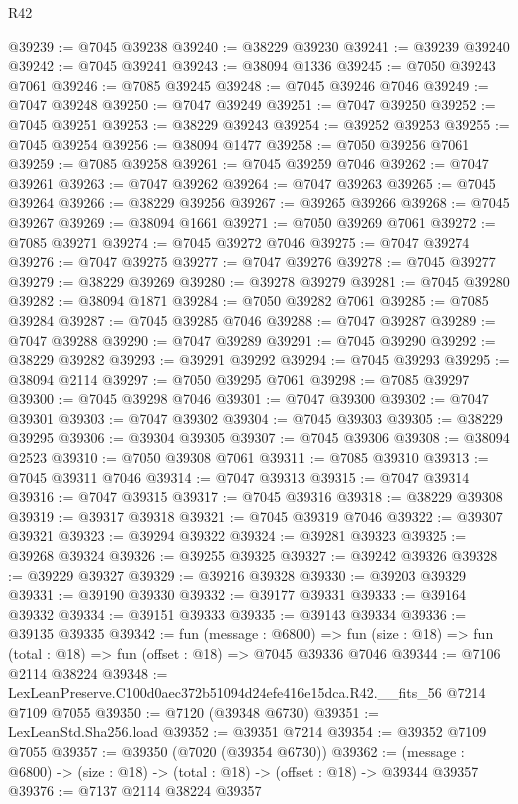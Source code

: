 \begin{lexlean}{R42}
\begin{coremodule}
{@39239 := @7045 @39238
@39240 := @38229 @39230
@39241 := @39239 @39240
@39242 := @7045 @39241
@39243 := @38094 @1336
@39245 := @7050 @39243 @7061
@39246 := @7085 @39245
@39248 := @7045 @39246 @7046
@39249 := @7047 @39248
@39250 := @7047 @39249
@39251 := @7047 @39250
@39252 := @7045 @39251
@39253 := @38229 @39243
@39254 := @39252 @39253
@39255 := @7045 @39254
@39256 := @38094 @1477
@39258 := @7050 @39256 @7061
@39259 := @7085 @39258
@39261 := @7045 @39259 @7046
@39262 := @7047 @39261
@39263 := @7047 @39262
@39264 := @7047 @39263
@39265 := @7045 @39264
@39266 := @38229 @39256
@39267 := @39265 @39266
@39268 := @7045 @39267
@39269 := @38094 @1661
@39271 := @7050 @39269 @7061
@39272 := @7085 @39271
@39274 := @7045 @39272 @7046
@39275 := @7047 @39274
@39276 := @7047 @39275
@39277 := @7047 @39276
@39278 := @7045 @39277
@39279 := @38229 @39269
@39280 := @39278 @39279
@39281 := @7045 @39280
@39282 := @38094 @1871
@39284 := @7050 @39282 @7061
@39285 := @7085 @39284
@39287 := @7045 @39285 @7046
@39288 := @7047 @39287
@39289 := @7047 @39288
@39290 := @7047 @39289
@39291 := @7045 @39290
@39292 := @38229 @39282
@39293 := @39291 @39292
@39294 := @7045 @39293
@39295 := @38094 @2114
@39297 := @7050 @39295 @7061
@39298 := @7085 @39297
@39300 := @7045 @39298 @7046
@39301 := @7047 @39300
@39302 := @7047 @39301
@39303 := @7047 @39302
@39304 := @7045 @39303
@39305 := @38229 @39295
@39306 := @39304 @39305
@39307 := @7045 @39306
@39308 := @38094 @2523
@39310 := @7050 @39308 @7061
@39311 := @7085 @39310
@39313 := @7045 @39311 @7046
@39314 := @7047 @39313
@39315 := @7047 @39314
@39316 := @7047 @39315
@39317 := @7045 @39316
@39318 := @38229 @39308
@39319 := @39317 @39318
@39321 := @7045 @39319 @7046
@39322 := @39307 @39321
@39323 := @39294 @39322
@39324 := @39281 @39323
@39325 := @39268 @39324
@39326 := @39255 @39325
@39327 := @39242 @39326
@39328 := @39229 @39327
@39329 := @39216 @39328
@39330 := @39203 @39329
@39331 := @39190 @39330
@39332 := @39177 @39331
@39333 := @39164 @39332
@39334 := @39151 @39333
@39335 := @39143 @39334
@39336 := @39135 @39335
@39342 := fun (message : @6800) =>
  fun (size : @18) => fun (total : @18) => fun (offset : @18) => @7045 @39336 @7046
@39344 := @7106 @2114 @38224
@39348 := LexLeanPreserve.C100d0aec372b51094d24efe416e15dca.R42.__fits_56 @7214 @7109 @7055
@39350 := @7120 (@39348 @6730)
@39351 := LexLeanStd.Sha256.load
@39352 := @39351 @7214
@39354 := @39352 @7109 @7055
@39357 := @39350 (@7020 (@39354 @6730))
@39362 := (message : @6800) -> (size : @18) -> (total : @18) -> (offset : @18) -> @39344 @39357
@39376 := @7137
    @2114
    @38224
    @39357
}
\end{coremodule}
\end{lexlean}
